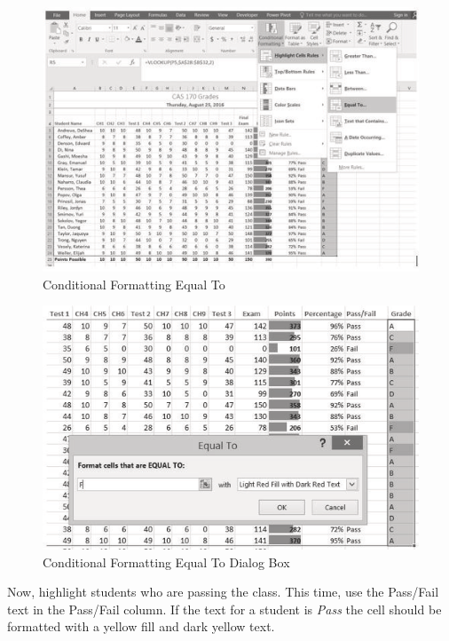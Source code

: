 \begin{figure}[H]
	\centering
	\includegraphics[width=\maxwidth{.95\linewidth}]{gfx/ch03_fig20}
	\caption{Conditional Formatting Equal To}
	\label{03:fig20}
\end{figure}

\begin{figure}[H]
	\centering
	\includegraphics[width=\maxwidth{.95\linewidth}]{gfx/ch03_fig21}
	\caption{Conditional Formatting Equal To Dialog Box}
	\label{03:fig21}
\end{figure}

Now, highlight students who are passing the class. This time, use the Pass/Fail text in the Pass/Fail column. If the text for a student is \textit{Pass} the cell should be formatted with a yellow fill and dark yellow text.

